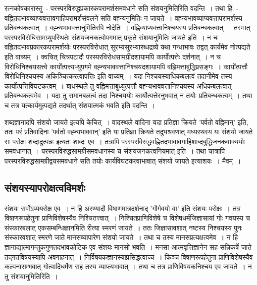 		रत्नकोषकारास्तु~- परस्परविरुद्धप्रकारकपरामर्शसमवधाने सति संशयनुमितिरिति वदन्ति~। तथा हि~- वह्नितदभावव्याप्यवत्तावगाहिपरामर्शसंवलने सति वह्न्यनुमितिः न जायते~। वह्न्यभावव्याप्यवत्तापरामर्शस्य प्रतिबन्धकत्वात्~। वह्न्यभाववत्तानुमितिरपि नोदेति~। वह्निव्याप्यवत्तानिश्चयस्य प्रतिबन्धकत्वात्~। तस्मात् परस्परविरोधिसामग्र्युपस्थितेः संशयजनकत्वोपगमात् प्रकृते संशयानुमितिः जायते इति~। न च वह्नितदभावप्रकारकपरामर्शयोः परस्परविरोधात् सुरभ्यसुरभ्यारब्धद्रव्ये यथा गन्धाभावः तद्वत् कार्यमेव नोत्पद्यते इति वाच्यम्~। क्वचित् चित्रपटादौ परस्परविरोधसामग्रीदशायामपि कार्योत्पत्तेः दर्शनात्~। न च विरोधिनिश्चयसत्त्वे कार्योत्पत्त्यभ्युपगमे वह्न्यभाववत्तानिश्चयदशायामपि वह्निमत्ताबुद्धिप्रसङ्गः~। कार्योत्पत्तौ विरोधिनिश्चयस्य अकिञ्चित्करत्वापत्तिः इति वाच्यम्~। यदा निश्चयस्याधिकबलत्वं तदानीमेव तस्य कार्योत्पत्तिविघटकत्वम्~। बाधस्थले तु वह्निमत्ताबुध्युत्पत्तौ वह्न्यभाववत्तानिश्चयस्य अधिकबलत्वात् प्रतिबन्धकत्वमेव~। यदा तु समानबलत्वं तदा निश्चययोः कार्योत्पत्तेरनुभवात् न तयोः प्रतिबन्धकत्वम्~। तथा च तत्र यत्कार्यमुत्पद्यते तदर्थात् संशयात्मकं भवति इति वदन्ति~।

		शब्दज्ञानादपि संशयो जायते इत्यपि केचित्~। वादस्थले वादिना यदा प्रतिज्ञा क्रियते 'पर्वतो वह्निमान्' इति, ततः परं प्रतिवादिना 'पर्वतो वह्न्यभाववान्' इति या प्रतिज्ञा क्रियते तदुभश्रवणात् मध्यस्थस्य यः संशयो जायते सः परोक्षः शब्दादुत्पन्नः इत्यतः शाब्दः एव~। तत्रापि परस्परविरुद्धवह्नितदभावावगाहिशाब्दबुद्धिजनकवाक्ययोः समवधानात्~। परस्परविरुद्धसामग्रीसमवधानस्य च संशयजनकत्वनियमात् इति~। तथा चात्रापि परस्परविरुद्धसामग्रीद्वयसमवधाने सति तयोः कार्यविघटकत्वाभावात् संशयो जायते इत्याशयः~। मैवम्~।

		\subsection{संशयस्यापरोक्षत्वविमर्शः}

		संशयः सर्वोऽप्ययरोक्ष एव~। न हि अरण्यादौ विषाणमात्रदर्शनाद् 'गौर्गवयो वा' इति संशयः परोक्षः~। तत्र विषाणरूपहेतुना प्राणिविशेषस्यैव निश्चितत्त्वात्~। निश्चितप्राणिविशेषे च विशेषधर्मजिज्ञासायां गोः गवयस्य च संस्कारबलात् एकसम्बन्धिज्ञानमिति रीत्या स्मरणं जायते~। ततः जिज्ञासावशात् नष्टस्य निश्चयस्य पुनः संस्कारवशात् स्मरणे जाते मानसव्यापारेण संशयो जायते~। तथा च तस्य मानसप्रत्यक्षत्वमेव~। न हि ज्ञानाद्यात्मागन्तुकगुणतदभावकोटिक  एव संशयः मानसो भवति~। मनसा आत्मवृत्तिज्ञानेन सह सन्निकर्षे जाते तद्गतविषयस्यापि अवगाहनात्~। निर्विषयकज्ञानस्याप्रसिद्धत्वाच्च~। किञ्च विषाणरूपहेतुना प्राणिविशेषस्यैव कल्पनासम्भवात् गोत्वादिधर्मेण सह तस्य व्याप्त्यभावात्~। तथा च तत्र प्राणिविषयकनिश्चय एव जायते~। न तु संशयानुमितिरिति~।

